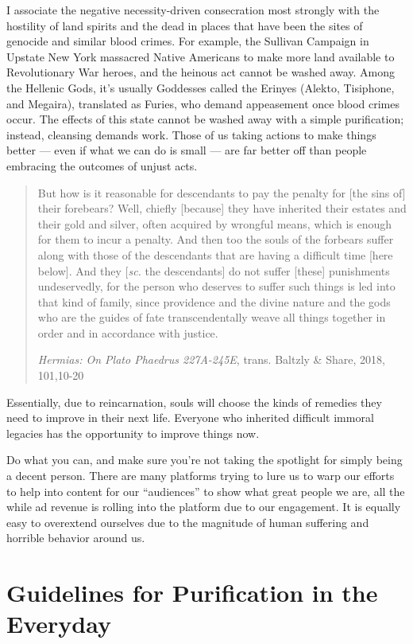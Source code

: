 \documentclass[
]{book}
\begin{document}
I associate the negative necessity-driven consecration most strongly with the hostility of land spirits and the dead in places that have been the sites of genocide and similar blood crimes. For example, the Sullivan Campaign in Upstate New York massacred Native Americans to make more land available to Revolutionary War heroes, and the heinous act cannot be washed away. Among the Hellenic Gods, it's usually Goddesses called the Erinyes (Alekto, Tisiphone, and Megaira), translated as Furies, who demand appeasement once blood crimes occur. The effects of this state cannot be washed away with a simple purification; instead, cleansing demands work. Those of us taking actions to make things better --- even if what we can do is small --- are far better off than people embracing the outcomes of unjust acts.

\begin{quote}
But how is it reasonable for descendants to pay the penalty for {[}the sins of{]} their forebears? Well, chiefly {[}because{]} they have inherited their estates and their gold and silver, often acquired by wrongful means, which is enough for them to incur a penalty. And then too the souls of the forbears suffer along with those of the descendants that are having a difficult time {[}here below{]}. And they {[}\emph{sc.} the descendants{]} do not suffer {[}these{]} punishments undeservedly, for the person who deserves to suffer such things is led into that kind of family, since providence and the divine nature and the gods who are the guides of fate transcendentally weave all things together in order and in accordance with justice.

\emph{Hermias: On Plato Phaedrus 227A-245E}, trans. Baltzly \& Share, 2018, 101,10-20
\end{quote}

Essentially, due to reincarnation, souls will choose the kinds of remedies they need to improve in their next life. Everyone who inherited difficult immoral legacies has the opportunity to improve things now.

Do what you can, and make sure you're not taking the spotlight for simply being a decent person. There are many platforms trying to lure us to warp our efforts to help into content for our ``audiences'' to show what great people we are, all the while ad revenue is rolling into the platform due to our engagement. It is equally easy to overextend ourselves due to the magnitude of human suffering and horrible behavior around us.

\hypertarget{guidelines-for-purification-in-the-everyday}{%
\section{Guidelines for Purification in the Everyday}\label{guidelines-for-purification-in-the-everyday}}
\end{document}
